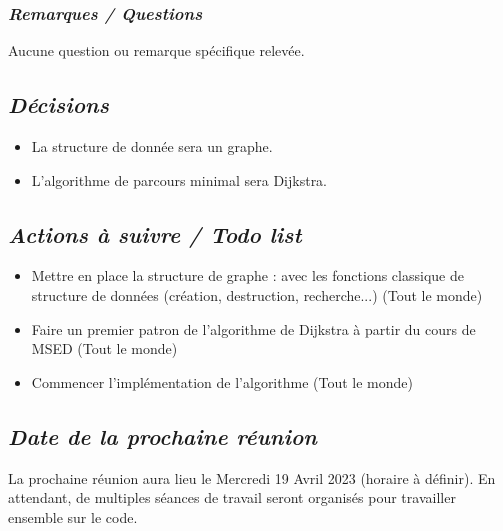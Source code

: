 \documentclass[french,a4paper]{article}
\begin{document}
\subsubsection*{\textit{Remarques / Questions}}
Aucune question ou remarque spécifique relevée.

\subsection*{\textit{Décisions}}
\begin{itemize}
  \item La structure de donnée sera un graphe.
  \item L'algorithme de parcours minimal sera Dijkstra.
\end{itemize}

\subsection*{\textit{Actions à suivre / Todo list}}
\begin{itemize}
  \item Mettre en place la structure de graphe : avec les fonctions classique de structure de données (création, destruction, recherche...) (Tout le monde)
  \item Faire un premier patron de l'algorithme de Dijkstra à partir du cours de MSED (Tout le monde)
  \item Commencer l'implémentation de l'algorithme (Tout le monde)
\end{itemize}

\subsection*{\textit{Date de la prochaine réunion}}
La prochaine réunion aura lieu le Mercredi 19 Avril 2023 (horaire à définir). 
En attendant, de multiples séances de travail seront organisés pour travailler ensemble sur le code.
\end{document}
